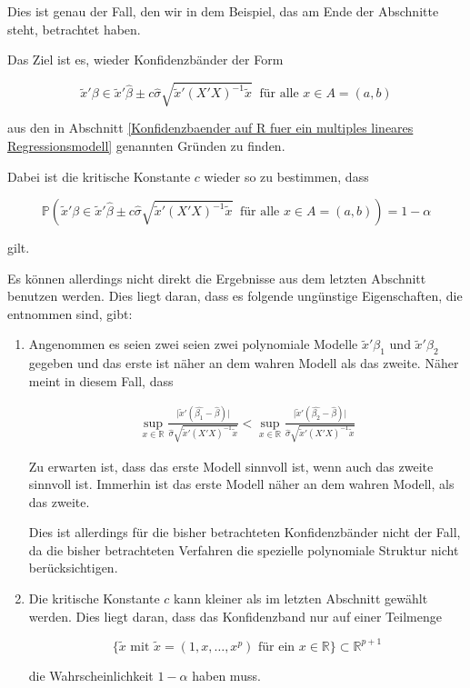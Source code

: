 \documentclass[12pt,a4paper]{article}
\theoremstyle{definition}
\theoremstyle{definition}
\theoremstyle{definition}
\theoremstyle{definition}
\begin{document}
Dies ist genau der Fall, den wir in dem Beispiel, das am Ende der Abschnitte steht, betrachtet haben. 

Das Ziel ist es, wieder Konfidenzbänder der Form 

\begin{equation}
\tilde{x}' \beta \in \tilde{x}' \hat{\beta} \pm c \hat{\sigma} \sqrt{\tilde{x}'(X'X)^{-1}\tilde{x}} ~ \text{ für alle } x \in A=(a,b)
\end{equation}

aus den in Abschnitt \ref{Konfidenzbaender auf R fuer ein multiples lineares Regressionsmodell} genannten Gründen zu  finden. 

Dabei ist die kritische Konstante $c$ wieder so zu bestimmen, dass

\begin{equation*}
\mathbb{P}(\tilde{x}' \beta \in \tilde{x}' \hat{\beta} \pm c \hat{\sigma} \sqrt{\tilde{x}'(X'X)^{-1} \tilde{x}} ~ \text{ für alle } x \in A=(a,b) ) = 1 - \alpha
\end{equation*}

gilt. 

Es können allerdings nicht direkt die Ergebnisse aus dem letzten Abschnitt benutzen werden. Dies liegt daran, dass es  folgende ungünstige Eigenschaften, die \cite[180]{Liu64} entnommen sind, gibt: 

\begin{enumerate}
\item Angenommen es seien zwei seien zwei polynomiale Modelle $\tilde{x}' \beta_1$ und $\tilde{x}' \beta_2$ gegeben und das erste ist näher an dem wahren Modell als das zweite. Näher meint in diesem Fall, dass

\begin{align*}
\sup_{x \in \mathbb{R}} \frac{\vert \tilde{x}'(\hat{\beta_1} - \hat{\beta}) \vert}{\hat{\sigma} \sqrt{\tilde{x}'(X'X)^{-1}\tilde{x}}} < 
\sup_{x \in \mathbb{R}} \frac{\vert \tilde{x}'(\hat{\beta_2} - \hat{\beta}) \vert}{\hat{\sigma} \sqrt{\tilde{x}'(X'X)^{-1}\tilde{x}}}
\end{align*}

Zu erwarten ist, dass das erste Modell sinnvoll ist, wenn auch das zweite sinnvoll ist. Immerhin ist das erste Modell näher an dem wahren Modell, als das zweite.

Dies ist allerdings für die bisher betrachteten Konfidenzbänder nicht der Fall, da die bisher betrachteten Verfahren die spezielle polynomiale Struktur nicht berücksichtigen. 

\item Die kritische Konstante $c$ kann kleiner als im letzten Abschnitt gewählt werden. Dies liegt daran, dass das Konfidenzband nur auf einer Teilmenge 

\begin{equation*}
\{ \tilde{x} \text{ mit } \tilde{x}=(1,x,\ldots,x^p) \text{ für ein } x \in \mathbb{R}\} \subset \mathbb{R}^{p+1}
\end{equation*}

die Wahrscheinlichkeit $1-\alpha$ haben muss.
\end{enumerate}
\end{document}
